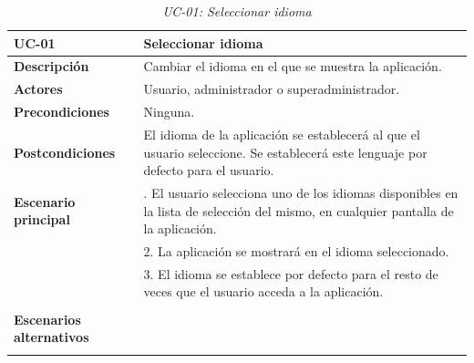 \begin{table}[H]
  \begin{center}
    \begin{tabularx}{16.4cm}{|l|X|}
      \hline
      \textbf{UC-01} & \textbf{Seleccionar idioma}\\
      \hline
      \textbf{Descripción} & Cambiar el idioma en el que se muestra la aplicación.\\
      \hline
      \textbf{Actores} & Usuario, administrador o superadministrador.\\
      \hline
      \textbf{Precondiciones} & Ninguna.\\
      \hline
      \textbf{Postcondiciones} & El idioma de la aplicación se establecerá al que el usuario seleccione. Se establecerá este lenguaje por defecto para el usuario.\\
      \hline
      \textbf{Escenario principal} & \smallskip 1. El usuario selecciona uno de los idiomas disponibles en la lista de selección del mismo, en cualquier pantalla de la aplicación.\\
      & 2. La aplicación se mostrará en el idioma seleccionado.\\
      & 3. El idioma se establece por defecto para el resto de veces que el usuario acceda a la aplicación.\\
      & \\
      \hline
      \textbf{Escenarios alternativos} & \\
      & \\
      \hline
    \end{tabularx}
    \caption{\textit{UC-01: Seleccionar idioma}}
    \label{tab:CU-idioma}
  \end{center}
\end{table}


